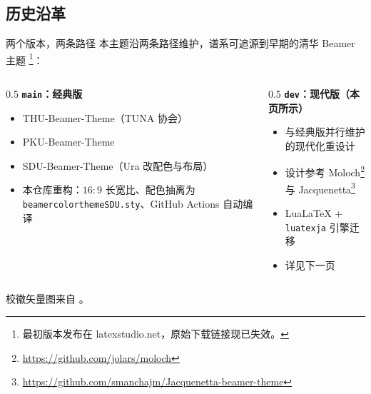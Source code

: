 \documentclass[aspectratio=169]{beamer}
\begin{document}
\subsection{历史沿革}

\begin{frame}{两个版本，两条路径}
    本主题沿两条路径维护，谱系可追源到早期的清华 Beamer 主题%
    \footnote{最初版本发布在 latexstudio.net，原始下载链接现已失效。}：
    \begin{columns}[T]
        \begin{column}{0.5\textwidth}
            {\bfseries\color{peaking} \texttt{main}：经典版}
            \begin{itemize}
                \item THU-Beamer-Theme（TUNA 协会）\cite{thu}
                \item PKU-Beamer-Theme \cite{pku}
                \item SDU-Beamer-Theme（Ura 改配色与布局）\cite{origin}
                \item 本仓库重构：\(16:9\) 长宽比、配色抽离为
                      \texttt{beamercolorthemeSDU.sty}、GitHub Actions 自动编译
            \end{itemize}
        \end{column}
        \begin{column}{0.5\textwidth}
            {\bfseries\color{peaking} \texttt{dev}：现代版（本页所示）}
            \begin{itemize}
                \item 与经典版并行维护的现代化重设计
                \item 设计参考 Moloch\footnote{\url{https://github.com/jolars/moloch}}
                      与 Jacquenetta\footnote{\url{https://github.com/smanchajm/Jacquenetta-beamer-theme}}
                \item Lua\LaTeX{} + \texttt{luatexja} 引擎迁移
                \item 详见下一页
            \end{itemize}
        \end{column}
    \end{columns}
    \vspace{1em}
    校徽矢量图来自 \cite{sdulogo}。
\end{frame}
\end{document}

